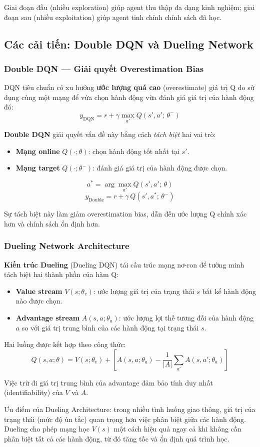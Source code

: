 Giai đoạn đầu (nhiều exploration) giúp agent thu thập đa dạng kinh nghiệm; giai đoạn sau (nhiều exploitation) giúp agent tinh chỉnh chính sách đã học.

\subsection{Các cải tiến: Double DQN và Dueling Network}

\subsubsection{Double DQN --- Giải quyết Overestimation Bias}

DQN tiêu chuẩn có xu hướng \textbf{ước lượng quá cao} (overestimate) giá trị Q do sử dụng cùng một mạng để vừa chọn hành động vừa đánh giá giá trị của hành động đó:
\[
y_{\text{DQN}} = r + \gamma \max_{a'} Q(s', a';\, \theta^-)
\]

\textbf{Double DQN} giải quyết vấn đề này bằng cách \textit{tách biệt} hai vai trò:
\begin{itemize}
    \item \textbf{Mạng online} $Q(\cdot;\theta)$: chọn hành động tốt nhất tại $s'$.
    \item \textbf{Mạng target} $Q(\cdot;\theta^-)$: đánh giá giá trị của hành động được chọn.
\end{itemize}

\[
a^* = \arg\max_{a'} Q(s', a';\, \theta)
\]
\[
y_{\text{Double}} = r + \gamma\, Q(s', a^*;\, \theta^-)
\]

Sự tách biệt này làm giảm overestimation bias, dẫn đến ước lượng Q chính xác hơn và chính sách ổn định hơn.

\subsubsection{Dueling Network Architecture}

\textbf{Kiến trúc Dueling} (Dueling DQN) tái cấu trúc mạng nơ-ron để tường minh tách biệt hai thành phần của hàm Q:

\begin{itemize}
    \item \textbf{Value stream} $V(s;\theta_v)$: ước lượng giá trị của trạng thái $s$ bất kể hành động nào được chọn.
    \item \textbf{Advantage stream} $A(s, a;\theta_a)$: ước lượng lợi thế tương đối của hành động $a$ so với giá trị trung bình của các hành động tại trạng thái $s$.
\end{itemize}

Hai luồng được kết hợp theo công thức:
\[
Q(s, a;\theta) = V(s;\theta_v) + \left[A(s, a;\theta_a) - \frac{1}{|A|}\sum_{a'} A(s, a';\theta_a)\right]
\]

Việc trừ đi giá trị trung bình của advantage đảm bảo tính duy nhất (identifiability) của $V$ và $A$.

Ưu điểm của Dueling Architecture: trong nhiều tình huống giao thông, giá trị của trạng thái (mức độ ùn tắc) quan trọng hơn việc phân biệt giữa các hành động. Dueling cho phép mạng học $V(s)$ một cách hiệu quả ngay cả khi không cần phân biệt tất cả các hành động, từ đó tăng tốc và ổn định quá trình học.
